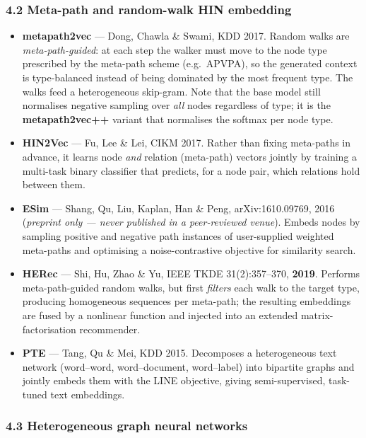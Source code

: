 \subsubsection*{4.2 Meta-path and random-walk HIN embedding}

\begin{itemize}\itemsep3pt
\item \textbf{metapath2vec} --- Dong, Chawla \& Swami, KDD 2017. Random walks are
  \emph{meta-path-guided}: at each step the walker must move to the node type prescribed by the
  meta-path scheme (e.g.\ APVPA), so the generated context is type-balanced instead of being
  dominated by the most frequent type. The walks feed a heterogeneous skip-gram. Note that the
  base model still normalises negative sampling over \emph{all} nodes regardless of type; it is the
  \textbf{metapath2vec++} variant that normalises the softmax per node type.
\item \textbf{HIN2Vec} --- Fu, Lee \& Lei, CIKM 2017. Rather than fixing meta-paths in advance, it
  learns node \emph{and} relation (meta-path) vectors jointly by training a multi-task binary
  classifier that predicts, for a node pair, which relations hold between them.
\item \textbf{ESim} --- Shang, Qu, Liu, Kaplan, Han \& Peng, arXiv:1610.09769, 2016
  (\emph{preprint only --- never published in a peer-reviewed venue}). Embeds nodes by sampling
  positive and negative path instances of user-supplied weighted meta-paths and optimising a
  noise-contrastive objective for similarity search.
\item \textbf{HERec} --- Shi, Hu, Zhao \& Yu, IEEE TKDE 31(2):357--370, \textbf{2019}. Performs
  meta-path-guided random walks, but first \emph{filters} each walk to the target type, producing
  homogeneous sequences per meta-path; the resulting embeddings are fused by a nonlinear function
  and injected into an extended matrix-factorisation recommender.
\item \textbf{PTE} --- Tang, Qu \& Mei, KDD 2015. Decomposes a heterogeneous text network
  (word--word, word--document, word--label) into bipartite graphs and jointly embeds them with the
  LINE objective, giving semi-supervised, task-tuned text embeddings.
\end{itemize}

\subsubsection*{4.3 Heterogeneous graph neural networks}

